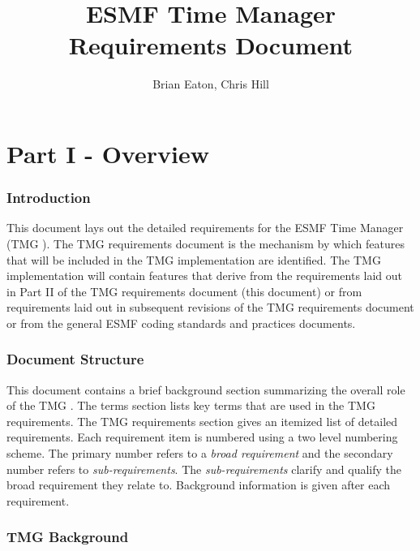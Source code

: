 \documentclass[english]{article}
\newcommand{\abbr}{TMG }
\begin{document}
\title{ESMF Time Manager Requirements Document}


\author{Brian Eaton, Chris Hill}
\date{}

\maketitle

\tableofcontents

\newpage
\part*{Part I - Overview}


\section{Introduction}

This document lays out the detailed requirements for the ESMF Time Manager (\abbr). 
The \abbr requirements document is the mechanism by which features that will be 
included in the \abbr implementation are identified. The \abbr implementation 
will contain features that derive from the requirements laid out in Part II of the 
\abbr requirements document (this document) or from requirements laid out in 
subsequent revisions of the \abbr requirements document or from the general 
ESMF coding standards and practices documents.

\section{Document Structure}

This document contains a brief background section summarizing the overall role 
of the \abbr. The terms section lists key terms that are used in the \abbr 
requirements. The \abbr requirements section gives an itemized list of detailed 
requirements. Each requirement item is numbered using a two level numbering 
scheme. The primary number refers to a {\it broad requirement} and the 
secondary number refers to {\it sub-requirements}. The {\it sub-requirements} 
clarify and qualify the broad requirement they relate to. Background information
is given after each requirement.


\section{\abbr Background}
\end{document}
